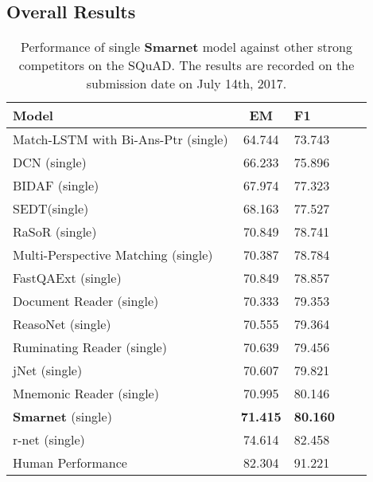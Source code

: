 \documentclass[letterpaper]{article} \usepackage{aaai18}  \usepackage{times}  \usepackage{helvet}  \usepackage{courier}  \usepackage{url}  \usepackage{graphicx}  \usepackage{booktabs}
\begin{document}
 \subsection{Overall Results}
 \begin{table}[!t]
	\centering
	\begin{tabular}{lclcl}
		\toprule
		Model & EM &F1 \\
		\midrule
		Match-LSTM with Bi-Ans-Ptr (single) &64.744&73.743\\
		DCN (single) &66.233&75.896\\
		BIDAF (single) &67.974 &77.323 \\
		SEDT(single) &68.163 &77.527\\
		RaSoR (single) &70.849 &78.741\\
		Multi-Perspective Matching (single) &70.387 &78.784 \\
		FastQAExt (single) &70.849 &78.857\\
		Document Reader (single) &70.333 &79.353 \\
		ReasoNet (single) &70.555 &79.364 \\
		Ruminating Reader (single) &70.639 &79.456 \\
		jNet (single) &70.607 &79.821 \\
		Mnemonic Reader (single) &70.995 &80.146 \\
		\textbf{Smarnet} (single) &\textbf{71.415} &\textbf{80.160} \\
		r-net (single) &74.614 &82.458 \\
		\midrule
		Human Performance &82.304        &91.221  \\
		\bottomrule	
	\end{tabular}
	\caption{Performance of single \textbf{Smarnet} model against other strong competitors on the SQuAD. The results are recorded on the submission date on July 14th, 2017.}
\end{table}
\end{document}
